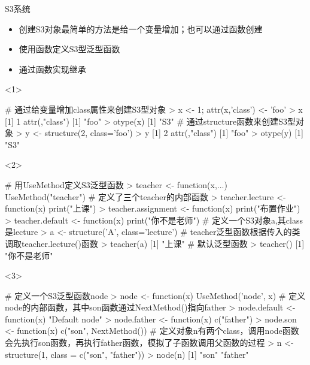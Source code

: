 \documentclass{beamerthemeMono}
\begin{document}
\begin{frame}[t,fragile]{\subsecname}{S3系统}
  \begin{itemize}
  \item<1-> 创建S3对象最简单的方法是给一个变量增加；也可以通过函数创建
  \item<2-> 使用函数定义S3型泛型函数
  \item<3-> 通过函数实现继承
  \end{itemize}  

\begin{overlayarea}{\textwidth}{0.5\textheight}
\begin{onlyenv}<1>
\begin{rcode}
# 通过给变量增加class属性来创建S3型对象
> x <- 1; attr(x,'class') <- 'foo'
> x
[1] 1
attr(,"class")
[1] "foo"
> otype(x)
[1] "S3"
# 通过structure函数来创建S3型对象
> y <- structure(2, class='foo')
> y
[1] 2
attr(,"class")
[1] "foo"
> otype(y)
[1] "S3"
\end{rcode}  
\end{onlyenv}

\begin{onlyenv}<2>
\begin{rcode}
# 用UseMethod定义S3泛型函数
> teacher <- function(x,...) UseMethod("teacher")
# 定义了三个teacher的内部函数
> teacher.lecture <- function(x) print("上课")
> teacher.assignment <- function(x) print("布置作业")
> teacher.default <- function(x) print("你不是老师")
# 定义一个S3对象a,其class是lecture
> a <- structure('A', class='lecture')
# teacher泛型函数根据传入的类调取teacher.lecture()函数
> teacher(a) 
[1] "上课"
# 默认泛型函数
> teacher()
[1] "你不是老师"
\end{rcode}  
\end{onlyenv}

\begin{onlyenv}<3>
\begin{rcode}
# 定义一个S3泛型函数node
> node <- function(x) UseMethod('node', x)
# 定义node的内部函数，其中son函数通过NextMethod()指向father
> node.default <- function(x) "Default node"
> node.father <- function(x) c("father")
> node.son <- function(x) c("son", NextMethod())
# 定义对象n有两个class，调用node函数会先执行son函数，再执行father函数，模拟了子函数调用父函数的过程
> n <- structure(1, class = c("son", "father"))
> node(n)
[1] "son"    "father"
\end{rcode}
\end{onlyenv}


\end{overlayarea}
\end{frame}
\end{document}
